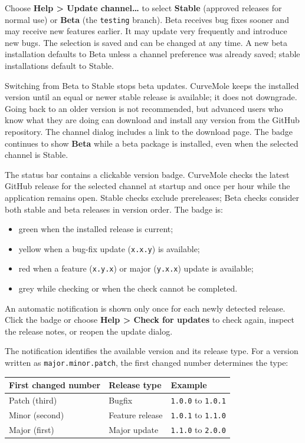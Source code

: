 \documentclass[
  10pt,
  a4paper,
  oneside]{scrreprt}
\providecommand{\tightlist}{%
  \setlength{\itemsep}{0pt}\setlength{\parskip}{0pt}}
\begin{document}
Choose \textbf{Help \textgreater{} Update channel\ldots{}} to select
\textbf{Stable} (approved releases for normal use) or \textbf{Beta} (the
\texttt{testing} branch). Beta receives bug fixes sooner and may receive
new features earlier. It may update very frequently and introduce new
bugs. The selection is saved and can be changed at any time. A new beta
installation defaults to Beta unless a channel preference was already
saved; stable installations default to Stable.

Switching from Beta to Stable stops beta updates. CurveMole keeps the
installed version until an equal or newer stable release is available;
it does not downgrade. Going back to an older version is not
recommended, but advanced users who know what they are doing can
download and install any version from the GitHub repository. The channel
dialog includes a link to the download page. The badge continues to show
\textbf{Beta} while a beta package is installed, even when the selected
channel is Stable.

The status bar contains a clickable version badge. CurveMole checks the
latest GitHub release for the selected channel at startup and once per
hour while the application remains open. Stable checks exclude
prereleases; Beta checks consider both stable and beta releases in
version order. The badge is:

\begin{itemize}
\tightlist
\item
  green when the installed release is current;
\item
  yellow when a bug-fix update (\texttt{x.x.y}) is available;
\item
  red when a feature (\texttt{x.y.x}) or major (\texttt{y.x.x}) update
  is available;
\item
  grey while checking or when the check cannot be completed.
\end{itemize}

An automatic notification is shown only once for each newly detected
release. Click the badge or choose \textbf{Help \textgreater{} Check for
updates} to check again, inspect the release notes, or reopen the update
dialog.

The notification identifies the available version and its release type.
For a version written as \texttt{major.minor.patch}, the first changed
number determines the type:

\begin{longtable}[]{@{}lll@{}}
\toprule
First changed number & Release type & Example\tabularnewline
\midrule
\endhead
Patch (third) & Bugfix & \texttt{1.0.0} to \texttt{1.0.1}\tabularnewline
Minor (second) & Feature release & \texttt{1.0.1} to
\texttt{1.1.0}\tabularnewline
Major (first) & Major update & \texttt{1.1.0} to
\texttt{2.0.0}\tabularnewline
\bottomrule
\end{longtable}
\end{document}
